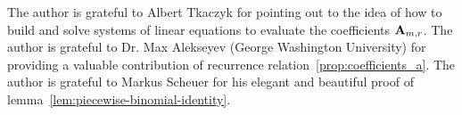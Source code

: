 The author is grateful to Albert Tkaczyk for pointing out to the idea of how to build and solve systems of linear equations to evaluate
the coefficients ${\mathbf{A}} \sb{m,r}$.
The author is grateful to Dr. Max Alekseyev (George Washington University) for providing a valuable contribution
of recurrence relation~\eqref{prop:coefficients_a}.
The author is grateful to Markus Scheuer for his elegant and beautiful proof
of lemma~\eqref{lem:piecewise-binomial-identity}.
